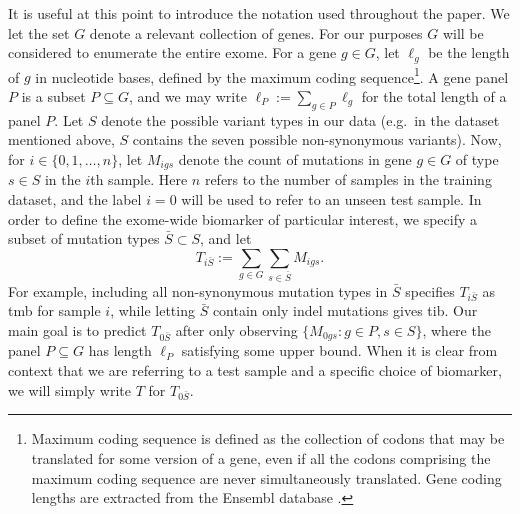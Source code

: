 \documentclass[12pt]{article}
\begin{document}
It is useful at this point to introduce the notation used throughout the paper. We let the set $G$ denote a relevant collection of genes. For our purposes $G$ will be considered to enumerate the entire exome. For a gene $g \in G$, let $\ell_g$ be the length of $g$ in nucleotide bases, defined by the maximum coding sequence\footnote{Maximum coding sequence is defined as the collection of codons that may be translated for some version of a gene, even if all the codons comprising the maximum coding sequence are never simultaneously translated. Gene coding lengths are extracted from the Ensembl database \citep{yates_ensembl_2020}.}.  A gene panel $P$ is a subset $P \subseteq G$, and we may write $\ell_P := \sum_{g \in P} \ell_g$ for the total length of a panel $P$. Let $S$ denote the possible variant types in our data (e.g.~in the dataset mentioned above, $S$ contains the seven possible non-synonymous variants). Now, for $i \in \{0, 1, \ldots, n\}$, let $M_{igs}$ denote the count of mutations in gene $g \in G$ of type $s \in S$ in the $i$th sample. Here $n$ refers to the number of samples in the training dataset, and the label $i=0$ will be used to refer to an unseen test sample.  In order to define the exome-wide biomarker of particular interest, we specify a subset of mutation types $\bar{S} \subset S$, and let
\begin{equation}
T_{i\bar{S}} := \sum_{g \in G} \sum_{s \in \bar{S}} M_{igs}.
\label{eq:biomarker}
\end{equation}
% 
For example, including all non-synonymous mutation types in $\bar{S}$ specifies $T_{i\bar{S}}$ as \acrshort{tmb} for sample $i$, while letting $\bar{S}$ contain only indel mutations gives \acrshort{tib}. Our main goal is to predict $T_{0\bar{S}}$ after only observing $\{M_{0gs}: g \in P, s \in S\}$, where the panel $P \subseteq G$ has length $\ell_P$ satisfying some upper bound. When it is clear from context that we are referring to a test sample and a specific choice of biomarker, we will simply write $T$ for $T_{0\bar{S}}$.
\end{document}
